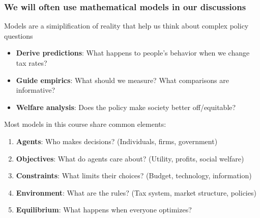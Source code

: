 \documentclass[aspectratio=169]{beamer}
\begin{document}
\begin{frame}
\frametitle{We will often use mathematical models in our discussions} 

Models are a simiplification of reality that help us think about complex policy questions
\begin{itemize}\setlength\itemsep{3pt}
\item \textbf{Derive predictions}: What happens to people's behavior when we change tax rates? 
\item \textbf{Guide empirics}: What should we measure? What comparisons are informative?
\item \textbf{Welfare analysis}: Does the policy make society better off/equitable?
\end{itemize} \medskip
Most models in this course share common elements:
\begin{enumerate}\setlength\itemsep{3pt}
\item \textbf{Agents}: Who makes decisions? (Individuals, firms, government)
\item \textbf{Objectives}: What do agents care about? (Utility, profits, social welfare)
\item \textbf{Constraints}: What limits their choices? (Budget, technology, information)
\item \textbf{Environment}: What are the rules? (Tax system, market structure, policies)
\item \textbf{Equilibrium}: What happens when everyone optimizes?
\end{enumerate} 
\end{frame}
\end{document}
